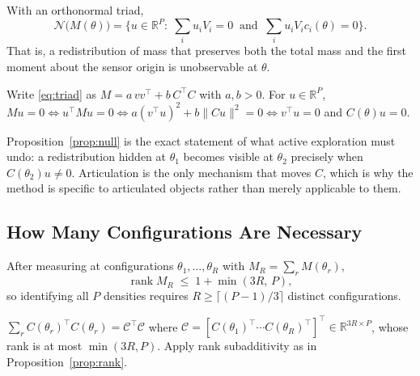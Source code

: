 \begin{proposition}
\label{prop:null}
With an orthonormal triad,
%
\begin{equation}
\mathcal{N}\big(M(\theta)\big)=\Big\{u\in\mathbb{R}^P:\;
\textstyle\sum_i u_iV_i=0\;\;\text{and}\;\;\sum_i u_iV_ic_i(\theta)=0\Big\}.
\end{equation}
%
That is, a redistribution of mass that preserves both the total mass and the
first moment about the sensor origin is unobservable at $\theta$.
\end{proposition}

\begin{IEEEproof}
Write \eqref{eq:triad} as $M=a\,vv^{\!\top}+b\,C^{\!\top}C$ with $a,b>0$. For
$u\in\mathbb{R}^P$, $Mu=0\iff u^{\!\top}\!Mu=0
\iff a(v^{\!\top}u)^2+b\|Cu\|^2=0\iff v^{\!\top}u=0$ and $C(\theta)u=0$.
\end{IEEEproof}

Proposition~\ref{prop:null} is the exact statement of what active exploration
must undo: a redistribution hidden at $\theta_1$ becomes visible at $\theta_2$
precisely when $C(\theta_2)u\neq0$. Articulation is the only mechanism that
moves $C$, which is why the method is specific to articulated objects rather
than merely applicable to them.

\subsection{How Many Configurations Are Necessary}
\label{sec:rounds}

\begin{proposition}
\label{prop:rounds}
After measuring at configurations $\theta_1,\dots,\theta_R$ with
$M_R=\sum_r M(\theta_r)$,
%
\begin{equation}
\operatorname{rank}M_R\;\le\;1+\min(3R,\,P),
\end{equation}
%
so identifying all $P$ densities requires
$R\ge\lceil (P-1)/3\rceil$ distinct configurations.
\end{proposition}

\begin{IEEEproof}
$\sum_r C(\theta_r)^{\!\top}C(\theta_r)=\mathcal{C}^{\!\top}\mathcal{C}$ where
$\mathcal{C}=[C(\theta_1)^{\!\top}\cdots C(\theta_R)^{\!\top}]^{\!\top}
\in\mathbb{R}^{3R\times P}$, whose rank is at most $\min(3R,P)$. Apply rank
subadditivity as in Proposition~\ref{prop:rank}.
\end{IEEEproof}


